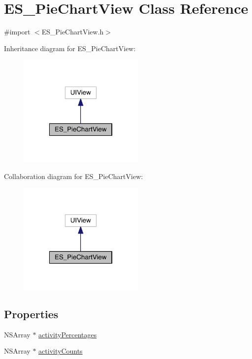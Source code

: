 \hypertarget{interface_e_s___pie_chart_view}{\section{E\+S\+\_\+\+Pie\+Chart\+View Class Reference}
\label{interface_e_s___pie_chart_view}
}


{\ttfamily \#import $<$E\+S\+\_\+\+Pie\+Chart\+View.\+h$>$}



Inheritance diagram for E\+S\+\_\+\+Pie\+Chart\+View\+:\nopagebreak
\begin{figure}[H]
\begin{center}
\leavevmode
\includegraphics[width=174pt]{d9/d5a/interface_e_s___pie_chart_view__inherit__graph}
\end{center}
\end{figure}


Collaboration diagram for E\+S\+\_\+\+Pie\+Chart\+View\+:\nopagebreak
\begin{figure}[H]
\begin{center}
\leavevmode
\includegraphics[width=174pt]{db/d6f/interface_e_s___pie_chart_view__coll__graph}
\end{center}
\end{figure}
\subsection*{Properties}
\begin{DoxyCompactItemize}
\item 
N\+S\+Array $\ast$ \hyperlink{interface_e_s___pie_chart_view_a7ac9fe97aae757b3ff14691d9802fda2}{activity\+Percentages}
\item 
N\+S\+Array $\ast$ \hyperlink{interface_e_s___pie_chart_view_a43a1fc1218a3bb71bf98106123e5e360}{activity\+Counts}
\end{DoxyCompactItemize}


